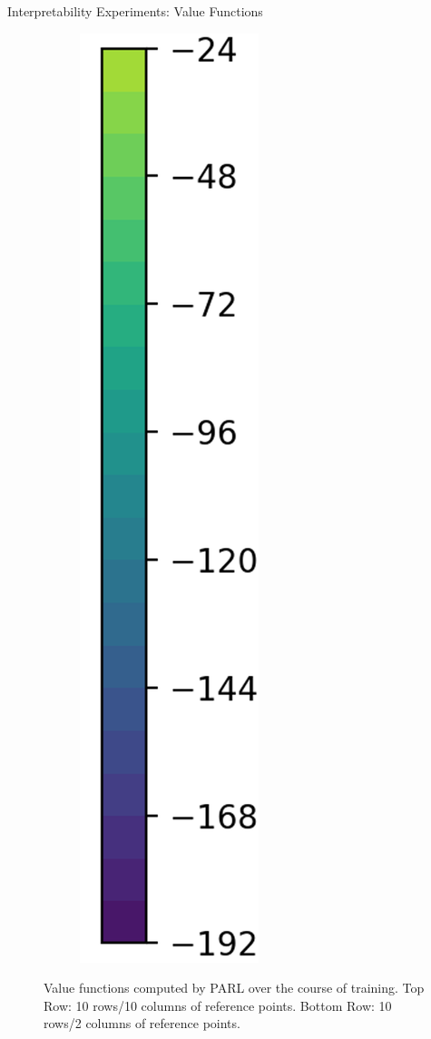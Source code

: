 \documentclass{beamer}
\begin{document}
\begin{frame}{Interpretability Experiments: Value Functions}
\begin{figure}[t]
\begin{subfigure}{0.05\linewidth}
      \includegraphics[width=\linewidth,trim=0 0 0 0,clip]{assets/ref_plots/r10c2_colorbar}
    \end{subfigure}
    \caption{Value functions computed by PARL over the course of training. Top Row: 10 rows/10 columns of reference points. Bottom Row: 10 rows/2 columns of reference points. }
  \end{figure}
\end{frame}
\end{document}
